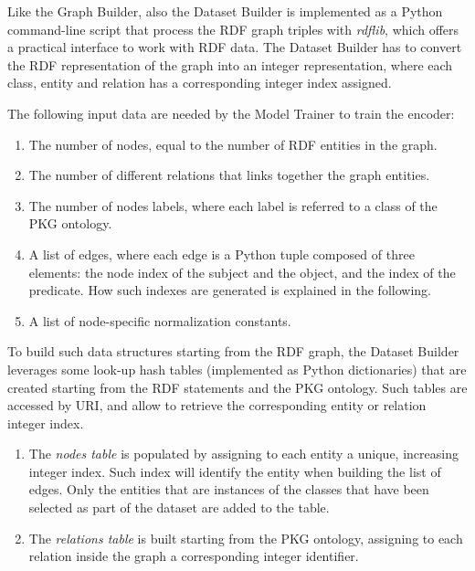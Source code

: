 \documentclass[%
    corpo=13.5pt,
    twoside,
    oldstyle,
    tipotesi=magistrale,
    greek,
    evenboxes
]{toptesi}
\begin{document}
Like the Graph Builder, also the Dataset Builder is implemented as a
Python command-line script that process the RDF graph triples with \emph{rdflib},
which offers a practical interface to work with RDF data.
The Dataset Builder has to convert the RDF representation of the graph into
an integer representation, where each class, entity and relation has a
corresponding integer index assigned.

The following input data are needed by the Model Trainer to train the
encoder:

\begin{enumerate}
    \item The number of nodes, equal to the number of RDF entities in the graph.
    \item The number of different relations that links together the graph
        entities.
    \item The number of nodes labels, where each label is referred to a class of
        the PKG ontology.
    \item A list of edges, where each edge is a Python tuple composed of three
        elements: the node index of the subject and the object, and the
        index of the predicate. How such indexes are generated is
        explained in the following.
    \item A list of node-specific normalization constants.
\end{enumerate}

To build such data structures starting from the RDF graph, the Dataset Builder
leverages some look-up hash tables (implemented as Python dictionaries) that are
created starting from the RDF statements and the PKG ontology. Such tables
are accessed by URI, and allow to retrieve the corresponding entity or
relation integer index.

\begin{enumerate}
    \item The \emph{nodes table} is populated by assigning to each entity
    a unique, increasing integer index. Such index will identify the entity when
    building the list of edges. Only the entities that are instances of the
    classes that have been selected as part of the dataset are added to the table.

    \item The \emph{relations table} is built starting from the PKG ontology,
    assigning to each relation inside the graph a corresponding integer
    identifier.
\end{enumerate}
\end{document}
